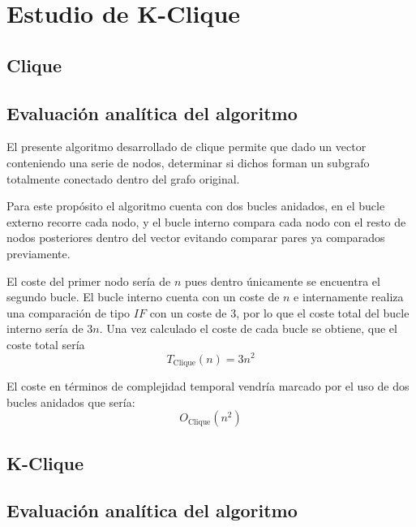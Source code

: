 \section{Estudio de K-Clique}\label{sec:clique}

\subsection{Clique}\label{subsec:clique}

\subsection*{Evaluación analítica del algoritmo}

 El presente algoritmo desarrollado de clique permite que dado un vector conteniendo una serie de nodos, determinar si dichos forman un subgrafo totalmente conectado dentro del grafo original.

 Para este propósito el algoritmo cuenta con dos bucles anidados, en el bucle externo recorre cada nodo, y el bucle interno compara cada nodo con el resto de nodos posteriores dentro del vector evitando comparar pares ya comparados previamente.
 
 El coste del primer nodo sería de $n$ pues dentro únicamente se encuentra el segundo bucle. 
 El bucle interno cuenta con un coste de $n$ e internamente realiza una comparación de tipo $IF$ con un coste de 3, por lo que el coste total del bucle interno sería de $3n$.
 Una vez calculado el coste de cada bucle se obtiene, que el coste total sería 
\begin{equation}
    T_{\mathrm{Clique}}(n) = 3n^2
\end{equation}

El coste en términos de complejidad temporal vendría marcado por el uso de dos bucles anidados que sería: 
\begin{equation}
    O_{\mathrm{Clique}}(n^2) 
\end{equation}



\subsection{K-Clique}\label{subsec:k-clique}


\subsection*{Evaluación analítica del algoritmo}

